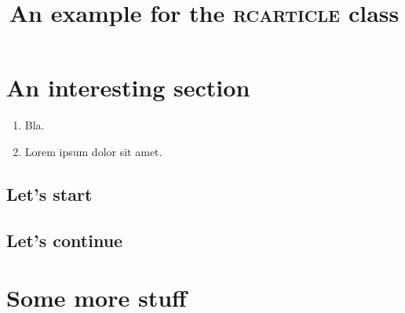 \documentclass[english]{rcarticle}
\title{An example for the \textsc{rcarticle} class}
\begin{document}
\maketitle

\section{An interesting section}

\lipsum[1]

\begin{enumerate}
\item Bla.
\item Lorem ipsum dolor sit amet.
\end{enumerate}

\subsection{Let's start}

\lipsum[2-5]

\subsection{Let's continue}

\lipsum[6-10]

\section{Some more stuff}

\lipsum[11-15]
\end{document}
